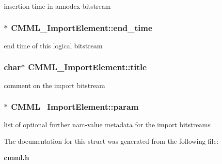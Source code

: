 insertion time in annodex bitstream 
\subsubsection{$\ast$ {\bf CMML\_\-Import\-Element::end\_\-time}}\label{structCMML__ImportElement_o7}


end time of this logical bitstream 
\subsubsection{\setlength{\rightskip}{0pt plus 5cm}char$\ast$ {\bf CMML\_\-Import\-Element::title}}\label{structCMML__ImportElement_o8}


comment on the import bitstream 
\subsubsection{$\ast$ {\bf CMML\_\-Import\-Element::param}}\label{structCMML__ImportElement_o9}


list of optional further nam-value metadata for the import bitstreams 

The documentation for this struct was generated from the following file:\begin{CompactItemize}
\item 
{\bf cmml.h}\end{CompactItemize}
